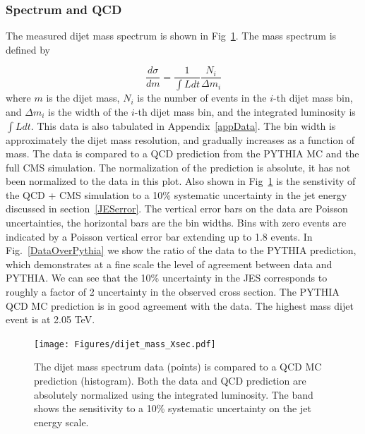 \clearpage
\subsubsection{Spectrum and QCD}
The measured dijet mass spectrum is shown in Fig~\ref{Spectrum}. The mass spectrum
is defined by 

\begin{equation}
\frac{d\sigma}{dm} = \frac{1}{\int Ldt} \frac{N_{i}}{\Delta m_i}
\label{eqXsec}
\end{equation}
where $m$ is the dijet mass, $N_i$ is the number of events in the $i$-th dijet mass bin, and $\Delta m_i$ is the width of the $i$-th 
dijet mass bin, and the integrated luminosity is $\int Ldt$.
This data is also tabulated in Appendix~\ref{appData}.  The bin width is approximately the dijet mass 
resolution, and gradually increases as a function of mass.
The data is compared to a QCD prediction from the PYTHIA MC and the full CMS simulation.
The normalization of the prediction is absolute, it has not been normalized to
the data in this plot.
Also shown in Fig~\ref{Spectrum} is the senstivity of the QCD + CMS simulation 
to a 10\% systematic uncertainty in the jet energy discussed in section~\ref{JESerror}.
The vertical error bars on the data are Poisson uncertainties, the horizontal
bars are the bin widths. Bins with zero events are indicated by a Poisson vertical error bar 
extending up to 1.8 events.
In Fig.~\ref{DataOverPythia} we show the ratio of 
the data to the PYTHIA prediction, which demonstrates at a fine scale the level of
agreement between data and PYTHIA. We can see that the 10\% uncertainty in the JES corresponds
to roughly a factor of 2 uncertainty in the observed cross section.
The PYTHIA QCD MC prediction is in good agreement with the data.   The highest mass dijet
event is at 2.05 TeV. 




\begin{figure}[!ht]
  \begin{center}
   \texttt{[image: Figures/dijet\_mass\_Xsec.pdf]}
    \caption{ The dijet mass spectrum data (points) is compared to a QCD MC prediction (histogram). Both the
    data and QCD prediction are absolutely normalized using the integrated luminosity.
    The band shows the sensitivity to a 10\% systematic uncertainty on the jet energy scale.}
    \label{Spectrum}
  \end{center}
\end{figure}

